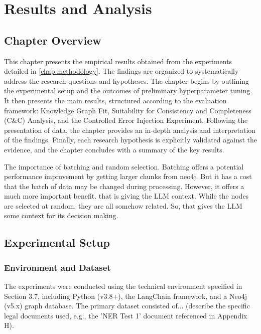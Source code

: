 \chapter{Results and Analysis}
\label{chap:results}

\section{Chapter Overview}
\label{sec:results_overview}
This chapter presents the empirical results obtained from the experiments detailed in \cref{chap:methodology}. The findings are organized to systematically address the research questions and hypotheses. The chapter begins by outlining the experimental setup and the outcomes of preliminary hyperparameter tuning. It then presents the main results, structured according to the evaluation framework: Knowledge Graph Fit, Suitability for Consistency and Completeness (C\&C) Analysis, and the Controlled Error Injection Experiment. Following the presentation of data, the chapter provides an in-depth analysis and interpretation of the findings. Finally, each research hypothesis is explicitly validated against the evidence, and the chapter concludes with a summary of the key results.

The importance of batching and random selection. Batching offers a potential performance improvement by getting larger chunks from neo4j. But it has a cost that the batch of data may be changed during processing. However, it offers a much more important benefit. that is giving the LLM context. While the nodes are selected at random, they are all somehow related. So, that gives the LLM some context for its decision making.

\section{Experimental Setup}
\label{sec:exp_setup}
\subsection{Environment and Dataset}
The experiments were conducted using the technical environment specified in Section 3.7, including Python (v3.8+), the LangChain framework, and a Neo4j (v5.x) graph database. The primary dataset consisted of... (describe the specific legal documents used, e.g., the 'NER Test 1' document referenced in Appendix H).

